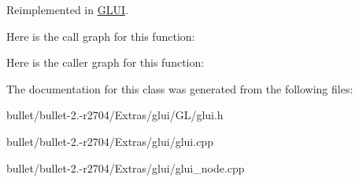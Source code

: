 Reimplemented in \hyperlink{class_g_l_u_i_a94398f830a14babcd93ac109082a221e}{G\+L\+U\+I}.



Here is the call graph for this function\+:




Here is the caller graph for this function\+:




The documentation for this class was generated from the following files\+:\begin{DoxyCompactItemize}
\item 
bullet/bullet-\/2.-\/r2704/\+Extras/glui/\+G\+L/glui.\+h\item 
bullet/bullet-\/2.-\/r2704/\+Extras/glui/glui.\+cpp\item 
bullet/bullet-\/2.-\/r2704/\+Extras/glui/glui\+\_\+node.\+cpp\end{DoxyCompactItemize}
